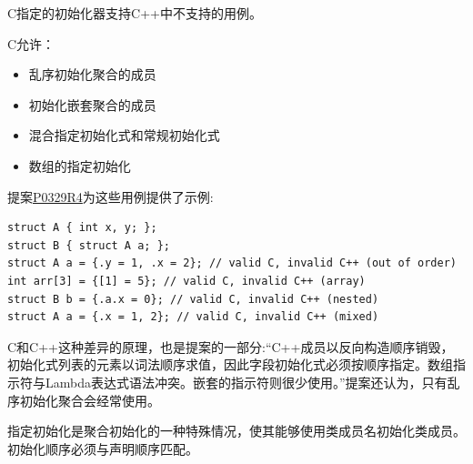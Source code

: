 \begin{tcolorbox}[breakable,enhanced jigsaw,colback=red!5!white,colframe=red!75!black,title={C和C++的区别}]
C指定的初始化器支持C++中不支持的用例。

C允许：

\begin{itemize}
\item 
乱序初始化聚合的成员

\item 
初始化嵌套聚合的成员

\item 
混合指定初始化式和常规初始化式

\item 
数组的指定初始化
\end{itemize}

提案\href{http://www.open-std.org/jtc1/sc22/wg21/docs/papers/2017/p0329r4.pdf}{P0329R4}为这些用例提供了示例:

\begin{lstlisting}[style=styleCXX]
struct A { int x, y; };
struct B { struct A a; };
struct A a = {.y = 1, .x = 2}; // valid C, invalid C++ (out of order)
int arr[3] = {[1] = 5}; // valid C, invalid C++ (array)
struct B b = {.a.x = 0}; // valid C, invalid C++ (nested)
struct A a = {.x = 1, 2}; // valid C, invalid C++ (mixed)
\end{lstlisting}

C和C++这种差异的原理，也是提案的一部分:“C++成员以反向构造顺序销毁，初始化式列表的元素以词法顺序求值，因此字段初始化式必须按顺序指定。数组指示符与Lambda表达式语法冲突。嵌套的指示符则很少使用。”提案还认为，只有乱序初始化聚合会经常使用。

\end{tcolorbox}	

\begin{tcolorbox}[breakable,enhanced jigsaw,colback=mygreen!5!white,colframe=mygreen!75!black,title={总结}]
指定初始化是聚合初始化的一种特殊情况，使其能够使用类成员名初始化类成员。初始化顺序必须与声明顺序匹配。
\end{tcolorbox}	

\newpage






